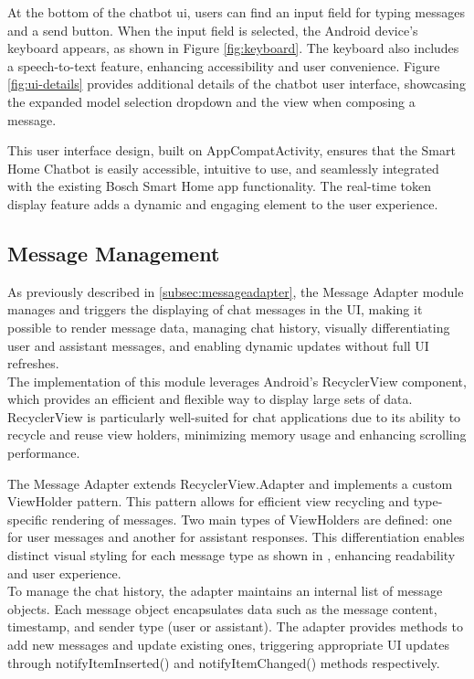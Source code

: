 At the bottom of the chatbot \gls{ui}, users can find an input field for typing messages and a send button. When the input field is selected, the Android device's keyboard appears, as shown in Figure \ref{fig:keyboard}. The keyboard also includes a speech-to-text feature, enhancing accessibility and user convenience.
Figure \ref{fig:ui-details} provides additional details of the chatbot user interface, showcasing the expanded model selection dropdown and the view when composing a message.

This user interface design, built on AppCompatActivity, ensures that the Smart Home Chatbot is easily accessible, intuitive to use, and seamlessly integrated with the existing Bosch Smart Home app functionality. The real-time token display feature adds a dynamic and engaging element to the user experience.

\subsection{Message Management}
As previously described in \cref{subsec:messageadapter}, the Message Adapter module manages and triggers the displaying of chat messages in the UI, making it possible to render message data, managing chat history, visually differentiating user and assistant messages, and enabling dynamic updates without full UI refreshes. \\
The implementation of this module leverages Android's RecyclerView component, which provides an efficient and flexible way to display large sets of data. RecyclerView is particularly well-suited for chat applications due to its ability to recycle and reuse view holders, minimizing memory usage and enhancing scrolling performance.


The Message Adapter extends RecyclerView.Adapter and implements a custom ViewHolder pattern. This pattern allows for efficient view recycling and type-specific rendering of messages. Two main types of ViewHolders are defined: one for user messages and another for assistant responses. This differentiation enables distinct visual styling for each message type as shown in , enhancing readability and user experience.\\
To manage the chat history, the adapter maintains an internal list of message objects. Each message object encapsulates data such as the message content, timestamp, and sender type (user or assistant). The adapter provides methods to add new messages and update existing ones, triggering appropriate UI updates through notifyItemInserted() and notifyItemChanged() methods respectively.


